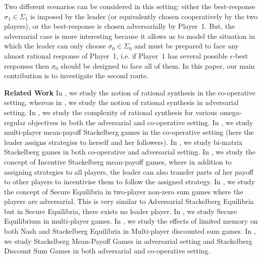 Two different scenarios can be considered in this setting: either the best-response $\sigma_1 \in \Sigma_1$ is imposed by the leader (or equivalently chosen cooperatively by the two players), or the best-response is chosen adversarially by Player~1. But, the adversarial case is more interesting because it allows us to model the situation in which the leader can only choose $\sigma_0 \in \Sigma_0$ and must be prepared to face any almost rational response of Player~1, i.e. if Player~1 has several possible $\epsilon$-best responses then $\sigma_0$ should be designed to face all of them. In this paper, our main contribution is to investigate the second route.

\textbf{Related Work} In \cite{FKL10}, we study the notion of rational synthesis in the co-operative setting, whereas in \cite{KPV16}, we study the notion of rational synthesis in adversarial setting. In \cite{CFGR16}, we study the complexity of rational synthesis for various omega-regular objectives in both the adversarial and co-operative setting. In \cite{GS14}, we study multi-player mean-payoff Stackelberg games in the co-operative setting (here the leader assigns strategies to herself and her followers). In \cite{GS18}, we study bi-matrix Stackelberg games in both co-operative and adversarial setting. In \cite{GSTDP16}, we study the concept of Incentive Stackelberg mean-payoff games, where in addition to assigning strategies to all players, the leader can also transfer parts of her payoff to other players to incentivise them to follow the assigned strategy. In \cite{CHJ06}, we study the concept of Secure Equilibria in two-player non-zero sum games where the players are adversarial.  This is very similar to Adversarial Stackelberg Equilibria but in Secure Equilibria, there exists no leader player.  In \cite{PFKSV14}, we study Secure Equilibrium in multi-player games.  In \cite{GS15}, we study the effects of limited memory on both Nash and Stackelberg Equilibria in Multi-player discounted sum games. In \cite{FGR20}, we study Stackelberg Mean-Payoff Games in adversarial setting and  Stackelberg Discount Sum Games in both adversarial and co-operative setting.


